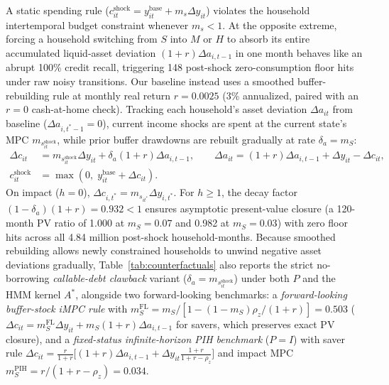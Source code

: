 \documentclass[11pt]{article}
\begin{document}
A static spending rule ($c_{it}^{\text{shock}} = y_{it}^{\text{base}} + m_s \Delta y_{it}$) violates the household intertemporal budget constraint whenever $m_s < 1$. At the opposite extreme, forcing a household switching from $S$ into $M$ or $H$ to absorb its entire accumulated liquid-asset deviation $(1+r)\Delta a_{i,t-1}$ in one month behaves like an abrupt 100\% credit recall, triggering 148 post-shock zero-consumption floor hits under raw noisy transitions. Our baseline instead uses a smoothed buffer-rebuilding rule at monthly real return $r = 0.0025$ (3\% annualized, paired with an $r = 0$ cash-at-home check). Tracking each household's asset deviation $\Delta a_{it}$ from baseline ($\Delta a_{i,t^*-1} = 0$), current income shocks are spent at the current state's MPC $m_{s_{it}^{\text{shock}}}$, while prior buffer drawdowns are rebuilt gradually at rate $\delta_a = m_S$:
\begin{equation}\label{eq:ibc_rule}
\begin{aligned}
\Delta c_{it} &= m_{s_{it}^{\text{shock}}}\Delta y_{it} + \delta_a (1 + r)\Delta a_{i,t-1}, \qquad
\Delta a_{it} = (1 + r)\Delta a_{i,t-1} + \Delta y_{it} - \Delta c_{it}, \\
c_{it}^{\text{shock}} &= \max\!\left(0,\; y_{it}^{\text{base}} + \Delta c_{it}\right).
\end{aligned}
\end{equation}
On impact ($h = 0$), $\Delta c_{i,t^*} = m_{s_{it^*}}\Delta y_{i,t^*}$. For $h \ge 1$, the decay factor $(1 - \delta_a)(1 + r) = 0.932 < 1$ ensures asymptotic present-value closure (a 120-month PV ratio of 1.000 at $m_S = 0.07$ and 0.982 at $m_S = 0.03$) with zero floor hits across all 4.84 million post-shock household-months. Because smoothed rebuilding allows newly constrained households to unwind negative asset deviations gradually, Table~\ref{tab:counterfactuals} also reports the strict no-borrowing \textit{callable-debt clawback} variant ($\delta_a = m_{s_{it}^{\text{shock}}}$) under both $P$ and the HMM kernel $A^*$, alongside two forward-looking benchmarks: a \textit{forward-looking buffer-stock iMPC rule} with $m_S^{\text{FL}} = m_S / [1 - (1 - m_S)\rho_z/(1+r)] = 0.503$ \citep{auclert2024intertemporal} ($\Delta c_{it} = m_S^{\text{FL}}\Delta y_{it} + m_S(1+r)\Delta a_{i,t-1}$ for savers, which preserves exact PV closure), and a \textit{fixed-status infinite-horizon PIH benchmark} ($P = I$) with saver rule $\Delta c_{it} = \frac{r}{1+r}\bigl[(1+r)\Delta a_{i,t-1} + \Delta y_{it}\frac{1+r}{1+r-\rho_z}\bigr]$ and impact MPC $m_S^{\text{PIH}} = r / (1 + r - \rho_z) = 0.034$.
\end{document}
